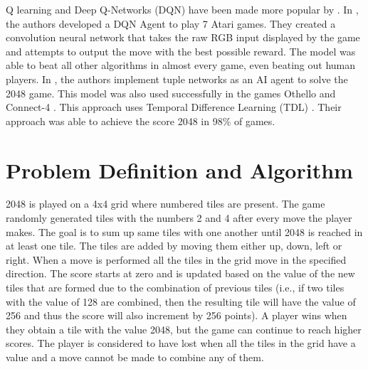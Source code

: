 \documentclass{svproc}
\begin{document}
    Q learning and Deep Q-Networks (DQN) have been made more popular by \cite{mnih2013playing, mnih2015human}. In \cite{mnih2013playing}, the authors developed a DQN Agent to play 7 Atari games. They created a convolution neural network that takes the raw RGB input displayed by the game and attempts to output the move with the best possible reward. The model was able to beat all other algorithms in almost every game, even beating out human players. In \cite{szubert2014temporal}, the authors implement tuple networks as an AI agent to solve the 2048 game. This model was also used successfully in the games Othello \cite{jaskowski2014systematic} and Connect-4 \cite{thill2012reinforcement}. This approach uses Temporal Difference Learning (TDL) \cite{sutton1988learning}. Their approach was able to achieve the score 2048 in 98\% of games.
   
    \section{Problem Definition and Algorithm} \label{Game Explanation}

    2048 is played on a 4x4 grid where numbered tiles are present. The game randomly generated tiles with the numbers 2 and 4 after every move the player makes. The goal is to sum up same tiles with one another until 2048 is reached in at least one tile. The tiles are added by moving them either up, down, left or right. When a move is performed all the tiles in the grid move in the specified direction. The score starts at zero and is updated based on the value of the new tiles that are formed due to the combination of previous tiles (i.e., if two tiles with the value of 128 are combined, then the resulting tile will have the value of 256 and thus the score will also increment by 256 points). A player wins when they obtain a tile with the value 2048, but the game can continue to reach higher scores. The player is considered to have lost when all the tiles in the grid have a value and a move cannot be made to combine any of them.


    
\end{document}
